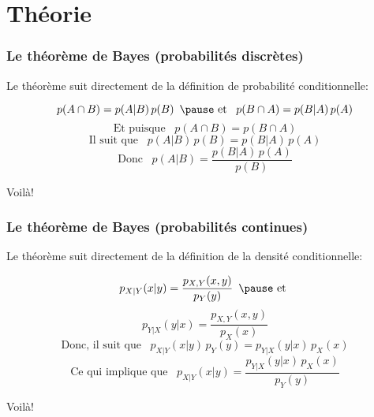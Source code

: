 \documentclass{beamer}
\begin{document}



\section{Théorie}


\begin{frame}
    \frametitle{Le théorème de Bayes (probabilités discrètes)}
    Le théorème suit directement de la définition de probabilité conditionnelle:

    \pause

    \[p(A \cap B) =  p(A | B) \, p(B) \,\,\, \pause \textrm{ et } \,\,\, p(B \cap A) =  p(B | A) \, p(A)\]
    \pause
    \[\textrm{Et puisque } \,\,\, p(A \cap B) = p(B \cap A)\]
    \pause
    \[\textrm{Il suit que } \,\,\, p(A | B) \, p(B) = p(B | A) \, p(A)\]
    \pause
    \[\textrm{Donc } \,\,\, p(A | B) = \frac{p(B | A) \, p(A)}{p(B)}\]
    
    Voilà!
\end{frame}


\begin{frame}
    \frametitle{Le théorème de Bayes (probabilités continues)}
    Le théorème suit directement de la définition de la densité conditionnelle:

    \pause

    \[p_{X|Y}(x|y) = \frac{p_{X,Y}(x,y)}{p_Y(y)} \,\,\, \pause \textrm{ et }\]
    \[p_{Y|X}(y|x) = \frac{p_{X,Y}(x,y)}{p_X(x)}\]
    \pause
    \[\textrm{Donc, il suit que } \,\,\, p_{X|Y}(x|y) \, p_Y(y) = p_{Y|X}(y|x) \, p_X(x)\]
    \pause
    \[\textrm{Ce qui implique que } \,\,\, p_{X|Y}(x|y) = \frac{p_{Y|X}(y|x) \, p_X(x)}{p_Y(y)}\]

    Voilà!
\end{frame}
\end{document}
